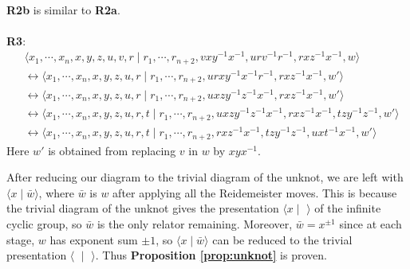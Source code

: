 \\
\textbf{R2b} is similar to \textbf{R2a}.
\\
\\
\textbf{R3}:
\begin{align*}
&\langle x_1,\cdots,x_n,x,y,z,u,v,r\mid r_1,\cdots,r_{n+2},vxy^{-1}x^{-1},urv^{-1}r^{-1},rxz^{-1}x^{-1},w\rangle
\\
&\longleftrightarrow\langle x_1,\cdots,x_n,x,y,z,u,r\mid r_1,\cdots,r_{n+2},urxy^{-1}x^{-1}r^{-1},rxz^{-1}x^{-1},w'\rangle
\\
&\longleftrightarrow\langle x_1,\cdots,x_n,x,y,z,u,r\mid r_1,\cdots,r_{n+2},uxzy^{-1}z^{-1}x^{-1},rxz^{-1}x^{-1},w'\rangle
\\
&\longleftrightarrow\langle x_1,\cdots,x_n,x,y,z,u,r,t\mid r_1,\cdots,r_{n+2},uxzy^{-1}z^{-1}x^{-1},rxz^{-1}x^{-1},tzy^{-1}z^{-1},w'\rangle
\\
&\longleftrightarrow\langle x_1,\cdots,x_n,x,y,z,u,r,t\mid r_1,\cdots,r_{n+2},rxz^{-1}x^{-1},tzy^{-1}z^{-1},uxt^{-1}x^{-1},w'\rangle
\end{align*}
Here $w'$ is obtained from replacing $v$ in $w$ by $xyx^{-1}$.


After reducing our diagram to the trivial diagram of the unknot, we are left with $\langle x \mid \bar w\rangle$, where $\bar w$ is $w$ after applying all the Reidemeister moves. This is because the trivial diagram of the unknot gives the presentation $\langle x\mid \,\,\rangle$ of the infinite cyclic group, so $\bar w$ is the only relator remaining.  Moreover, $\bar w = x^{\pm1}$ since at each stage, $w$ has exponent sum $\pm 1$, so $\langle x \mid \bar w\rangle$ can be reduced to the trivial presentation $\langle \,\, \mid \,\, \rangle$. Thus \textbf{Proposition \ref{prop:unknot}} is proven. 

